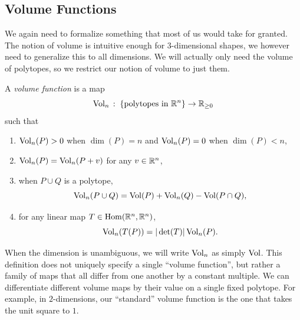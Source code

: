\documentclass[12pt,oneside]{../../sfsuthesis}
\begin{document}
\subsection{Volume Functions}
We again need to formalize something that most of us would take for granted.
The notion of volume is intuitive enough for 3-dimensional shapes, we however need to generalize this to all dimensions.
We will actually only need the volume of polytopes, so we restrict our notion of volume to just them.
\begin{definition}
    A \emph{volume function} is a map
    \[
        \operatorname{Vol}_n\,:\; \{\text{polytopes in \( \mathbb{R}^n \)}\} \to \mathbb{R}_{\geq 0}
    \]
    such that
    \begin{enumerate}
        \item \( \operatorname{Vol}_n(P) > 0 \) when \( \dim(P) = n \) and \( \operatorname{Vol}_n(P) = 0 \) when \( \dim(P) < n \),
        \item \( \operatorname{Vol}_n(P) =  \operatorname{Vol}_n(P+v) \) for any \( v \in \mathbb{R}^n \),
        \item when \( P \cup Q \) is a polytope,
              \[
                  \operatorname{Vol}_n(P \cup Q) = \operatorname{Vol}(P) + \operatorname{Vol}_n(Q) - \operatorname{Vol}(P \cap Q),
              \]
        \item for any linear map \( T \in \operatorname{Hom}(\mathbb{R}^n, \mathbb{R}^n) \),
              \[
                  \operatorname{Vol}_n(T(P)) = |\det(T)|\operatorname{Vol}_n(P).
              \]
    \end{enumerate}
\end{definition}
When the dimension is unambiguous, we will write \( \operatorname{Vol}_n \) as simply \( \operatorname{Vol} \).
This definition does not uniquely specify a single ``volume function'', but rather a family of maps that all differ from one another by a constant multiple.
We can differentiate different volume maps by their value on a single fixed polytope.
For example, in \( 2 \)-dimensions, our ``standard'' volume function is the one that takes the unit square to \( 1 \).
\end{document}

